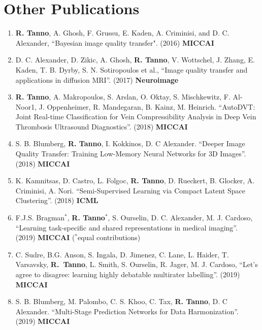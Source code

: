 \section*{Other Publications}
\footnotesize
\begin{enumerate}
	\item \textbf{R. Tanno}, A. Ghosh, F. Grussu, E. Kaden, A. Criminisi, and D. C. Alexander, “Bayesian image quality transfer". (2016) \textbf{MICCAI}
	
	\item D. C. Alexander, D. Zikic, A. Ghosh, \textbf{R. Tanno}, V. Wottschel, J. Zhang, E. Kaden, T. B. Dyrby, S. N. Sotiropoulos et al., “Image quality transfer and applications in diffusion MRI”.  (2017) \textbf{Neuroimage}
	
	\item \textbf{R. Tanno}, A. Makropoulos, S. Arslan, O. Oktay, S. Mischkewitz, F. Al-Noor1, J. Oppenheimer, R. Mandegaran, B. Kainz, M. Heinrich. ``AutoDVT: Joint Real-time Classification for Vein Compressibility Analysis in Deep Vein Thrombosis Ultrasound Diagnostics''. (2018) \textbf{MICCAI}
	
	\item S. B. Blumberg, \textbf{R. Tanno}, I. Kokkinos, D. C Alexander. ``Deeper Image Quality Transfer: Training Low-Memory Neural Networks for 3D Images''. (2018) \textbf{MICCAI }
	
	\item K. Kamnitsas, D. Castro, L. Folgoc, \textbf{R. Tanno}, D. Rueckert, B. Glocker, A. Criminisi, A. Nori. ``Semi-Supervised Learning via Compact Latent Space Clustering''. (2018) \textbf{ICML}
	
	\item F.J.S. Bragman$^*$, \textbf{R. Tanno}$^*$, S. Ourselin, D. C. Alexander, M. J. Cardoso, ``Learning task-specific and shared representations in medical imaging''.  (2019) \textbf{MICCAI} ($^*$equal contributions)
	
	\item C. Sudre, B.G. Anson, S. Ingala, D. Jimenez, C. Lane, L. Haider, T. Varsavsky,  \textbf{R.~Tanno}, L. Smith, S. Ourselin, R. Jager, M. J. Cardoso, ``Let's agree to disagree: learning highly debatable multirater labelling''.  (2019) \textbf{MICCAI} 
	
	\item S. B. Blumberg, M. Palombo, C. S. Khoo, C. Tax, \textbf{R. Tanno}, D. C Alexander. “Multi-Stage Prediction Networks for Data Harmonization”. (2019) \textbf{MICCAI }
	

\end{enumerate}
